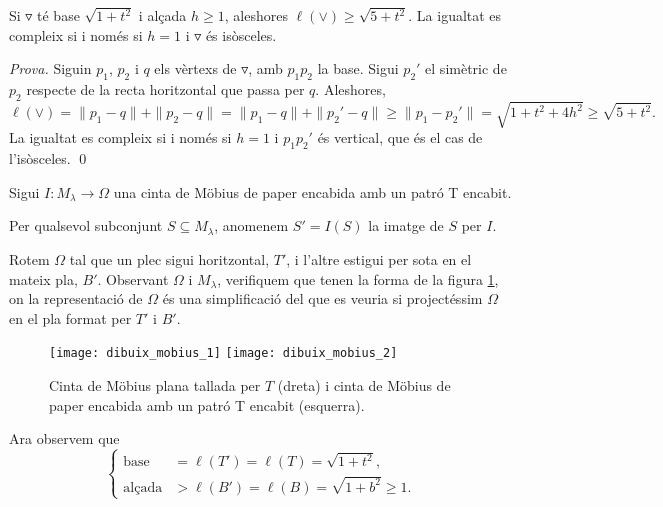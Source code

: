 \begin{defi}
    Si $\triangledown$ té base $\sqrt{1+t^2}$ i alçada $h\ge1$, aleshores $\ell(\lor)\ge\sqrt{5+t^2}$. La igualtat es compleix si i només si $h=1$ i $\triangledown$ és isòsceles.
\end{defi}

{
    \color{green!50!black}
    \textit{Prova.}
    Siguin $p_1$, $p_2$ i $q$ els vèrtexs de $\triangledown$, amb $p_1p_2$ la base. Sigui $p_2'$ el simètric de $p_2$ respecte de la recta horitzontal que passa per $q$. Aleshores,
    \begin{equation*}
        \ell(\lor) = \|p_1-q\| + \|p_2-q\| = \|p_1-q\| + \|p_2'-q\| \ge \|p_1-p_2'\| = \sqrt{1+t^2+4h^2}\ge\sqrt{5+t^2}.
    \end{equation*}
    La igualtat es compleix si i només si $h=1$ i $p_1p_2'$ és vertical, que és el cas de l'isòsceles.
    \qed
}

Sigui $I:M_\lambda\to\Omega$ una cinta de Möbius de paper encabida amb un patró T encabit.
\begin{nota}
    Per qualsevol subconjunt $S\subseteq M_\lambda$, anomenem $S'=I(S)$ la imatge de $S$ per $I$.
\end{nota}

Rotem $\Omega$ tal que un plec sigui horitzontal, $T'$, i l'altre estigui per sota en el mateix pla, $B'$. Observant $\Omega$ i $M_\lambda$, verifiquem que tenen la forma de la figura \ref{fig:mobius_1}, on la representació de $\Omega$ és una simplificació del que es veuria si projectéssim $\Omega$ en el pla format per $T'$ i $B'$.

\begin{figure}[htbp]
    \centering
    \texttt{[image: dibuix\_mobius\_1]}
    \quad
    \raisebox{4\height}{$\xrightarrow{\scalebox{1.5}{$I$}}$}
    \quad
    \texttt{[image: dibuix\_mobius\_2]}
    \caption{Cinta de Möbius plana tallada per $T$ (dreta) i cinta de Möbius de paper encabida amb un patró T encabit (esquerra).}
    \label{fig:mobius_1}
\end{figure}

Ara observem que 
\begin{equation*}
    \begin{cases}
        \text{base} &= \ell(T') = \ell(T) = \sqrt{1+t^2},\\
        \text{alçada} &> \ell(B') = \ell(B) = \sqrt{1+b^2}\ge1.
    \end{cases}
\end{equation*}

